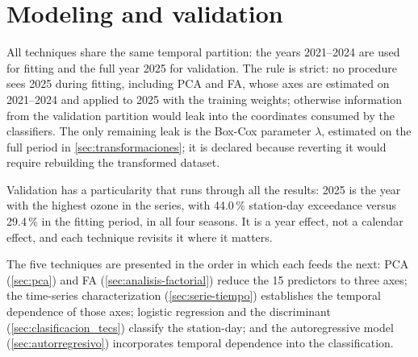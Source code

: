 \section{Modeling and validation}
\label{sec:modelacion}

All techniques share the same temporal partition: the years 2021--2024 are
used for fitting and the full year 2025 for validation. The rule is strict:
no procedure sees 2025 during fitting, including PCA and FA, whose axes are
estimated on 2021--2024 and applied to 2025 with the training weights;
otherwise information from the validation partition would leak into the
coordinates consumed by the classifiers. The only remaining leak is the
Box-Cox parameter $\lambda$, estimated on the full period in
\cref{sec:transformaciones}; it is declared because reverting it would
require rebuilding the transformed dataset.

Validation has a particularity that runs through all the results: 2025 is the
year with the highest ozone in the series, with 44.0\,\% station-day
exceedance versus 29.4\,\% in the fitting period, in all four seasons. It is
a year effect, not a calendar effect, and each technique revisits it where it
matters.

The five techniques are presented in the order in which each feeds the next:
PCA (\cref{sec:pca}) and FA (\cref{sec:analisis-factorial}) reduce the
15 predictors to three axes; the time-series characterization
(\cref{sec:serie-tiempo}) establishes the temporal dependence of those axes;
logistic regression and the discriminant (\cref{sec:clasificacion_tecs})
classify the station-day; and the autoregressive model
(\cref{sec:autorregresivo}) incorporates temporal dependence into the
classification.
